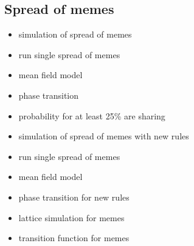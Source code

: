 \documentclass[12pt]{article}
\begin{document}
\subsection{Spread of memes}

\singlespacing
\begin{itemize}

\item{\large simulation of spread of memes}

\vspace{1cm}

\item{\large run single spread of memes }

\vspace{1cm}

\item{\large mean field model}

\vspace{1cm}

\item{\large phase transition}

\vspace{1cm}


\item{\large probability for at least 25\% are sharing}

\vspace{1cm}


\item{\large simulation of spread of memes with new rules}

\vspace{1cm}

\item{\large run single spread of memes }

\vspace{1cm}

\item{\large mean field model}

\vspace{1cm}

\item{\large phase transition for new rules}

\vspace{1cm}

\item{\large lattice simulation for memes}

\vspace{1cm}

\item{\large transition function for memes}

\vspace{1cm}


\end{itemize}
\end{document}
